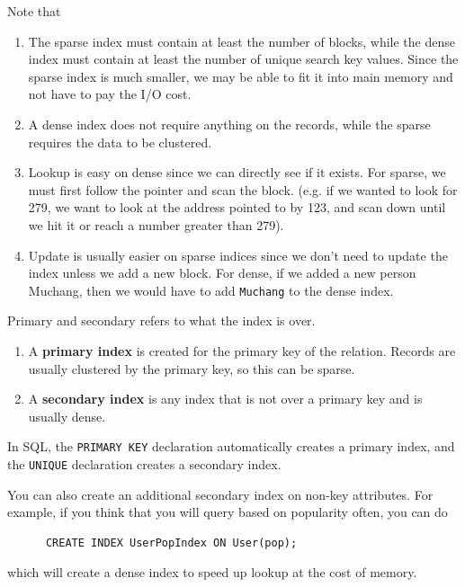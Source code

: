 \begin{definition}[Index]
    Note that 
    \begin{enumerate}
      \item The sparse index must contain at least the number of blocks, while the dense index must contain at least the number of unique search key values. Since the sparse index is much smaller, we may be able to fit it into main memory and not have to pay the I/O cost. 
      \item A dense index does not require anything on the records, while the sparse requires the data to be clustered. 
      \item Lookup is easy on dense since we can directly see if it exists. For sparse, we must first follow the pointer and scan the block. (e.g. if we wanted to look for 279, we want to look at the address pointed to by 123, and scan down until we hit it or reach a number greater than 279). 
      \item Update is usually easier on sparse indices since we don't need to update the index unless we add a new block. For dense, if we added a new person Muchang, then we would have to add \texttt{Muchang} to the dense index. 
    \end{enumerate}
  \end{definition}

  \begin{definition}
    Primary and secondary refers to what the index is over. 
    \begin{enumerate}
      \item A \textbf{primary index} is created for the primary key of the relation. Records are usually clustered by the primary key, so this can be sparse. 
      \item A \textbf{secondary index} is any index that is not over a primary key and is usually dense. 
    \end{enumerate}
    In SQL, the \texttt{PRIMARY KEY} declaration automatically creates a primary index, and the \texttt{UNIQUE} declaration creates a secondary index. 
  \end{definition}

  \begin{example}
    You can also create an additional secondary index on non-key attributes. For example, if you think that you will query based on popularity often, you can do 
    \begin{lstlisting}
      CREATE INDEX UserPopIndex ON User(pop); 
    \end{lstlisting}
    which will create a dense index to speed up lookup at the cost of memory. 
  \end{example}

